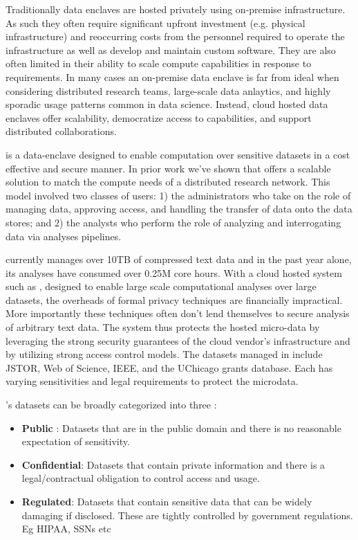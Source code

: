 Traditionally data enclaves are hosted privately using on-premise infrastructure. As 
such they often require significant upfront investment (e.g. physical infrastructure) and reoccurring costs 
from the personnel required to operate the infrastructure as well as develop and maintain custom software. 
They are also often limited in their ability to scale
compute capabilities in response to requirements. In many cases an on-premise data enclave is far from ideal
when considering distributed research teams, large-scale data anlaytics, and highly sporadic
usage patterns common in data science. Instead, cloud hosted data enclaves offer scalability,
democratize access to capabilities, and support distributed collaborations. 

\NAME is a data-enclave designed to enable computation over sensitive datasets
in a cost effective and secure manner. In prior work we've shown that \NAME offers
a scalable solution to match the compute needs of a distributed research network.
This model involved two classes of users: 1) the administrators who take on the role of managing
data, approving access, and handling the transfer of data onto the data stores; and 2) the analysts
who perform the role of analyzing and interrogating data via analyses pipelines.

\NAME currently manages over 10TB of compressed text data and in the past year
alone, its analyses have consumed over 0.25M core hours. With a cloud hosted system
such as \NAMENS, designed to enable large scale computational analyses over large datasets,
the overheads of formal privacy techniques are financially impractical. More importantly
these techniques often don't lend themselves to secure analysis of arbitrary text data. 
The system thus protects the hosted micro-data by leveraging the strong security
guarantees of the cloud vendor's infrastructure and by utilizing strong access control
models. The datasets managed in \NAME include JSTOR, Web of Science, IEEE,
and the UChicago grants database. Each has varying sensitivities and legal requirements to
protect the microdata.

\NAMENS's datasets can be broadly categorized into three \cite{ist_dataclass}:
\begin{itemize}
\item \textbf{Public} : Datasets that are in the public domain and there is no
  reasonable expectation of sensitivity.
\item \textbf{Confidential}: Datasets that contain private information and there is a legal/contractual obligation to control access and usage.
\item \textbf {Regulated}: Datasets that contain sensitive data that can be widely damaging if disclosed.
  These are tightly controlled by government regulations. Eg HIPAA, SSNs etc
\end{itemize}

